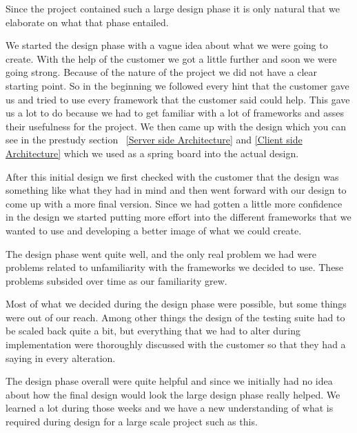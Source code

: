 Since the project contained such a large design phase it is only natural that we elaborate on what that phase entailed.

We started the design phase with a vague idea about what we were going to create. With the help of the customer we got a little further and soon we were going strong. Because of the nature of the project we did not have a clear starting point. So in the beginning we followed every hint that the customer gave us and tried to use every framework that the customer said could help. This gave us a lot to do because we had to get familiar with a lot of frameworks and asses their usefulness for the project. We then came up with the design which you can see in the prestudy section ~\ref{Server side Architecture} and \ref{Client side Architecture} which we used as a spring board into the actual design.

After this initial design we first checked with the customer that the design was something like what they had in mind and then went forward with our design to come up with a more final version. Since we had gotten a little more confidence in the design we started putting more effort into the different frameworks that we wanted to use and developing a better image of what we could create.

The design phase went quite well, and the only real problem we had were problems related to unfamiliarity with the frameworks we decided to use. These problems subsided over time as our familiarity grew.

Most of what we decided during the design phase were possible, but some things were out of our reach. Among other things the design of the testing suite had to be scaled back quite a bit, but everything that we had to alter during implementation were thoroughly discussed with the customer so that they had a saying in every alteration.

The design phase overall were quite helpful and since we initially had no idea about how the final design would look the large design phase really helped. We learned a lot during those weeks and we have a new understanding of what is required during design for a large scale project such as this.
